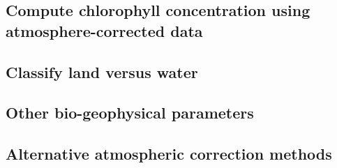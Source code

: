 \subsection{Compute chlorophyll concentration using atmosphere-corrected data}

\subsection{Classify land versus water}

\subsection{Other bio-geophysical parameters}

\subsection{Alternative atmospheric correction methods}